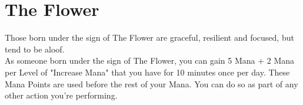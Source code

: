 \section{The Flower}\label{zodiac:flower}

Those born under the sign of The Flower are graceful, resilient and focused, but tend to be aloof.\\
As someone born under the sign of The Flower, you can gain 5 Mana + 2 Mana per Level of "Increase Mana" that you have for 10 minutes once per day.
These Mana Points are used before the rest of your Mana.
You can do so as part of any other action you're performing.\\